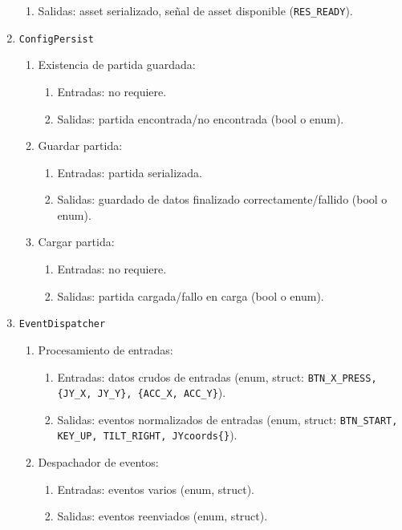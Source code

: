 \documentclass[11pt,a4paper]{article}
\begin{document}
\begin{enumerate}
\begin{enumerate}
      \item Salidas: asset serializado, señal de asset disponible (\texttt{RES\_READY}).
    \end{enumerate}
  \item \texttt{ConfigPersist}
    \begin{enumerate}
      \item Existencia de partida guardada:
      \begin{enumerate}
        \item Entradas: no requiere.
        \item Salidas: partida encontrada/no encontrada (bool o enum).
      \end{enumerate}
      \item Guardar partida:
      \begin{enumerate}
        \item Entradas: partida serializada.
        \item Salidas: guardado de datos finalizado correctamente/fallido (bool o enum).
      \end{enumerate}
      \item Cargar partida:
      \begin{enumerate}
        \item Entradas: no requiere.
        \item Salidas: partida cargada/fallo en carga (bool o enum).
      \end{enumerate}
    \end{enumerate}
  \item \texttt{EventDispatcher}
    \begin{enumerate}
      \item Procesamiento de entradas:
      \begin{enumerate}
        \item Entradas: datos crudos de entradas (enum, struct: \texttt{BTN\_X\_PRESS, \{JY\_X, JY\_Y\}, \{ACC\_X, ACC\_Y\}}).
        \item Salidas: eventos normalizados de entradas (enum, struct: \texttt{BTN\_START, KEY\_UP, TILT\_RIGHT, JYcoords\{\}}).
      \end{enumerate}
      \item Despachador de eventos:
      \begin{enumerate}
        \item Entradas: eventos varios (enum, struct).
        \item Salidas: eventos reenviados (enum, struct).
      \end{enumerate}

\end{enumerate}
\end{enumerate}
\end{document}
